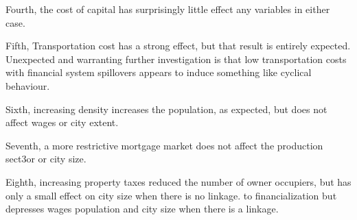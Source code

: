 Fourth, the cost of capital has surprisingly little effect any variables in  either case.

Fifth, Transportation cost has a strong effect, but that result is entirely expected. Unexpected and warranting further investigation is that low transportation costs with financial system spillovers appears to induce something like cyclical behaviour.

Sixth, increasing density increases the population, as expected, but does not affect wages or city extent.

Seventh, a more restrictive mortgage market does not affect the production sect3or or city size.

Eighth, increasing property taxes reduced the number of owner occupiers, but has only a small effect on city size when there is no linkage. to financialization but depresses wages population and city size when there is a linkage. 


